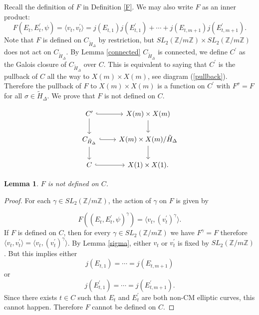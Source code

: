 \documentclass[12pt]{amsart}
\newtheorem{lem}[thm]{Lemma}
\theoremstyle{definition}
\theoremstyle{remark}
\numberwithin{equation}{section}
\newcommand{\Z}{\mathbb{Z}}
\begin{document}
Recall the definition of $F$ in Definition \ref{F}. We may also write $F$ as an inner product:  
$$F(E_{t}, E_{t}^{\prime}, \psi)= \langle v_t , v^{\prime}_{t} \rangle = j(E_{t,1})j(E^{\prime}_{t,1})+ \cdots +j(E_{t, m+1})j(E^{\prime}_{t, m+1}).$$
Note that $F$ is defined on $C_{\tilde{H}_{\Delta}}$ by restriction, but $SL_{2}(\Z/m\Z) \times SL_{2}(\Z/m\Z)$ does not act on $C_{\tilde{H}_{\Delta}}$. By Lemma \ref{connected} $C_{\tilde{H}_{\Delta}}$ is connected, we define $C^{\prime}$ as the Galois closure of $C_{\tilde{H}_{\Delta}}$ over $C$. This is equivalent to saying that $C^{\prime}$ is the pullback of $C$ all the way to $X(m) \times X(m)$, see diagram (\ref{pullback}). Therefore the pullback of $F$ to $X(m) \times X(m)$ is a function on $C^{\prime}$ with $F^{\sigma}=F$ for all $\sigma \in \tilde{H}_{\Delta}$. We prove that $F$ is not defined on $C$.


\begin{equation}\label{pullback}
\begin{tikzcd}
 C^{\prime} \arrow[r,hook] \arrow[d] & X(m) \times X(m) \arrow[d] \\
 C_{\tilde{H}_{\Delta}} \arrow[d] \arrow[r,hook] & X(m) \times X(m)/ \tilde{H}_{\Delta} \arrow[d] \\
 C  \arrow[r,hook] & X(1) \times X(1). 	
\end{tikzcd} 
\end{equation}

\vspace{1em}
 \begin{lem}\label{F is not defined on C}
 	$F$ is not defined on $C$.
 \end{lem}
 
 \begin{proof}
 For each $\gamma \in SL_{2}(\Z/m\Z)$, the action of $\gamma$ on $F$ is given by  
 
$$F((E_{t}, E_{t}^{\prime}, \psi)^{\gamma})= \langle v_t , (v^{\prime}_{t})^{\gamma} \rangle.$$
If $F$ is defined on $C$, then for every $\gamma \in SL_{2}(\Z/m\Z)$ we have $F^{\gamma}=F$ therefore $\langle v_{t}, v_{t}^{\prime} \rangle = \langle v_t, (v_{t}^{\prime})^{\gamma} \rangle$. By Lemma \ref{sigma}, either $v_{t}$ or $v^{\prime}_{t}$ is fixed by $SL_{2}(\Z/m\Z)$. But this implies either
$$j(E_{t,1})=\cdots=j(E_{t, m+1})$$ 
or
$$j(E^{\prime}_{t,1})=\cdots=j(E^{\prime}_{t, m+1}).$$ 
Since there exists $t \in C$ such that $E_{t}$ and $E_{t}^{\prime}$ are both non-CM elliptic curves, this cannot happen. Therefore $F$ cannot be defined on $C$. 

 \end{proof}
\end{document}
